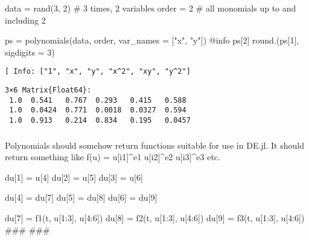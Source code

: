 \documentclass[
]{article}
\newenvironment{Shaded}{\begin{snugshade}}{\end{snugshade}}
\newcommand{\CommentTok}[1]{\textcolor[rgb]{0.37,0.37,0.37}{#1}}
\newcommand{\FloatTok}[1]{\textcolor[rgb]{0.68,0.00,0.00}{#1}}
\newcommand{\FunctionTok}[1]{\textcolor[rgb]{0.28,0.35,0.67}{#1}}
\newcommand{\NormalTok}[1]{\textcolor[rgb]{0.00,0.23,0.31}{#1}}
\newcommand{\OperatorTok}[1]{\textcolor[rgb]{0.37,0.37,0.37}{#1}}
\newcommand{\PreprocessorTok}[1]{\textcolor[rgb]{0.68,0.00,0.00}{#1}}
\newcommand{\StringTok}[1]{\textcolor[rgb]{0.13,0.47,0.30}{#1}}
\begin{document}
\begin{Shaded}
\begin{Highlighting}[]
\NormalTok{data }\OperatorTok{=} \FunctionTok{rand}\NormalTok{(}\FloatTok{3}\NormalTok{,  }\FloatTok{2}\NormalTok{) }\CommentTok{\# 3 times, 2 variables}
\NormalTok{order }\OperatorTok{=} \FloatTok{2} \CommentTok{\# all monomials up to and including 2}

\NormalTok{ps }\OperatorTok{=} \FunctionTok{polynomials}\NormalTok{(data, order, var\_names }\OperatorTok{=}\NormalTok{ [}\StringTok{"x"}\NormalTok{, }\StringTok{"y"}\NormalTok{])}
\PreprocessorTok{@info}\NormalTok{ ps[}\FloatTok{2}\NormalTok{]}
\FunctionTok{round}\NormalTok{.(ps[}\FloatTok{1}\NormalTok{], sigdigits }\OperatorTok{=} \FloatTok{3}\NormalTok{)}
\end{Highlighting}
\end{Shaded}

\begin{verbatim}
[ Info: ["1", "x", "y", "x^2", "xy", "y^2"]
\end{verbatim}

\begin{verbatim}
3×6 Matrix{Float64}:
 1.0  0.541   0.767  0.293   0.415   0.588
 1.0  0.0424  0.771  0.0018  0.0327  0.594
 1.0  0.913   0.214  0.834   0.195   0.0457
\end{verbatim}

\clearpage

\subsubsection{}\label{section}

\subsubsection{}\label{section-1}

Polynomials should somehow return functions suitable for use in DE.jl.
It should return something like f(u) = u{[}i1{]}\^{}e1 u{[}i2{]}\^{}e2
u{[}i3{]}\^{}e3 etc.

du{[}1{]} = u{[}4{]} du{[}2{]} = u{[}5{]} du{[}3{]} = u{[}6{]}

du{[}4{]} = du{[}7{]} du{[}5{]} = du{[}8{]} du{[}6{]} = du{[}9{]}

du{[}7{]} = f1(t, u{[}1:3{]}, u{[}4:6{]}) du{[}8{]} = f2(t, u{[}1:3{]},
u{[}4:6{]}) du{[}9{]} = f3(t, u{[}1:3{]}, u{[}4:6{]}) \#\#\# \#\#\#
\end{document}

